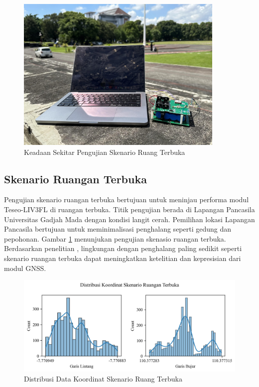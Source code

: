 \begin{figure}[H]
	\centering
	\includegraphics[width=10cm]{contents/chapter-4/4-skenario-outdoor/keadaan.jpg}
	\caption{Keadaan Sekitar Pengujian Skenario Ruang Terbuka}
	\label{Fig: outdoor-keadaan}
\end{figure}

\subsection{Skenario Ruangan Terbuka}
Pengujian skenario ruangan terbuka bertujuan untuk meninjau performa modul Teseo\hyp{}LIV3FL di ruangan terbuka. Titik pengujian berada di Lapangan Pancasila Universitas Gadjah Mada dengan kondisi langit cerah. Pemilihan lokasi Lapangan Pancasila bertujuan untuk meminimalisasi penghalang seperti gedung dan pepohonan. Gambar \ref{Fig: outdoor-keadaan} menunjukan pengujian skenasio ruangan terbuka. Berdasarkan penelitian \cite{Lu2018}, lingkungan dengan penghalang paling sedikit seperti skenario ruangan terbuka dapat meningkatkan ketelitian dan kepresisian dari modul GNSS.

\begin{figure}[H]
	\centering
	\begin{adjustbox}{width=\textwidth}
		\includegraphics{contents/chapter-4/4-skenario-outdoor/distribution.png}
	\end{adjustbox}
	\caption{Distribusi Data Koordinat Skenario Ruang Terbuka}
	\label{Fig:outdoor-distribution}
\end{figure}


